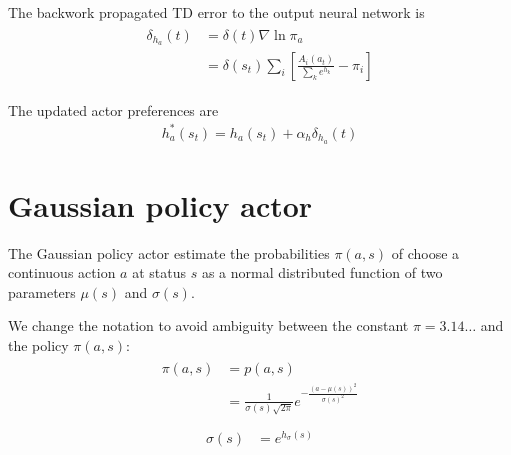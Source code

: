 \documentclass[]{article}
\begin{document}
The backwork propagated TD error to the output neural network is
\begin{align}
\begin{split}
    \delta_{h_a}(t)& = \delta(t) \nabla \ln \pi_a
    \\
    & = \delta(s_t) \sum_i \left[
		\frac{A_i(a_t)}{\sum_k e^{h_k}} - \pi_i
	\right]
\end{split}
\end{align}

The updated actor preferences are
\begin{align}
	h^*_a(s_t) = h_a(s_t) + \alpha_h \delta_{h_a}(t) 
\end{align}

\section{Gaussian policy actor}

The Gaussian policy actor estimate the probabilities $ \pi(a, s) $ of choose a continuous action $ a $ at status $ s $ as a normal distributed function of two parameters $ \mu(s) $ and $ \sigma(s) $.

We change the notation to avoid ambiguity between the constant $ \pi = 3.14 \dots $ and the policy $ \pi(a,s) $:
\begin{align}
\begin{split}
	\pi(a, s)&	= p(a, s)
	\\
	&			= \frac{1}{\sigma(s) \sqrt{2 \pi}} e^{-\frac{(a-\mu(s))^2}{\sigma(s)^2}}
	\\
\end{split}
\end{align}
\begin{align}
	\sigma(s)&	= e^{h_\sigma(s)}	
\end{align}
\end{document}
